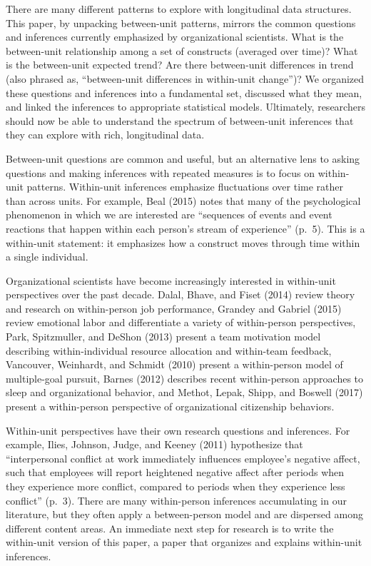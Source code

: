 \documentclass[english,,man]{apa6}
\theoremstyle{definition}
\theoremstyle{definition}
\theoremstyle{definition}
\theoremstyle{remark}
\begin{document}
There are many different patterns to explore with longitudinal data
structures. This paper, by unpacking between-unit patterns, mirrors the
common questions and inferences currently emphasized by organizational
scientists. What is the between-unit relationship among a set of
constructs (averaged over time)? What is the between-unit expected
trend? Are there between-unit differences in trend (also phrased as,
\enquote{between-unit differences in within-unit change})? We organized
these questions and inferences into a fundamental set, discussed what
they mean, and linked the inferences to appropriate statistical models.
Ultimately, researchers should now be able to understand the spectrum of
between-unit inferences that they can explore with rich, longitudinal
data.

Between-unit questions are common and useful, but an alternative lens to
asking questions and making inferences with repeated measures is to
focus on within-unit patterns. Within-unit inferences emphasize
fluctuations over time rather than across units. For example, Beal
(2015) notes that many of the psychological phenomenon in which we are
interested are \enquote{sequences of events and event reactions that
happen within each person's stream of experience} (p.~5). This is a
within-unit statement: it emphasizes how a construct moves through time
within a single individual.

Organizational scientists have become increasingly interested in
within-unit perspectives over the past decade. Dalal, Bhave, and Fiset
(2014) review theory and research on within-person job performance,
Grandey and Gabriel (2015) review emotional labor and differentiate a
variety of within-person perspectives, Park, Spitzmuller, and DeShon
(2013) present a team motivation model describing within-individual
resource allocation and within-team feedback, Vancouver, Weinhardt, and
Schmidt (2010) present a within-person model of multiple-goal pursuit,
Barnes (2012) describes recent within-person approaches to sleep and
organizational behavior, and Methot, Lepak, Shipp, and Boswell (2017)
present a within-person perspective of organizational citizenship
behaviors.

Within-unit perspectives have their own research questions and
inferences. For example, Ilies, Johnson, Judge, and Keeney (2011)
hypothesize that \enquote{interpersonal conflict at work immediately
influences employee's negative affect, such that employees will report
heightened negative affect after periods when they experience more
conflict, compared to periods when they experience less conflict}
(p.~3). There are many within-person inferences accumulating in our
literature, but they often apply a between-person model and are
dispersed among different content areas. An immediate next step for
research is to write the within-unit version of this paper, a paper that
organizes and explains within-unit inferences.
\end{document}
